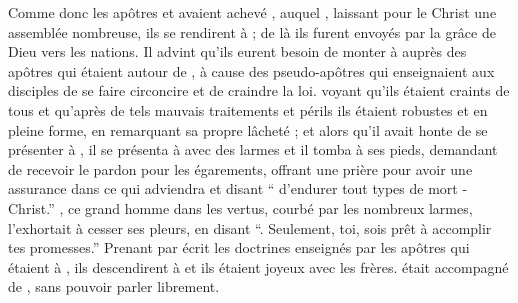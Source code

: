 Comme donc les apôtres  et  avaient achevé , auquel , laissant pour le Christ une assemblée nombreuse, ils se rendirent à  ;
de là ils furent envoyés par la grâce de Dieu vers les nations.
Il advint qu'ils eurent besoin de monter à  auprès des apôtres qui étaient autour de , à cause des pseudo-apôtres qui enseignaient aux disciples de se faire circoncire et de craindre la loi.
 voyant qu'ils étaient craints de tous et qu'après de tels mauvais traitements et périls ils étaient robustes et en pleine forme, 
 en remarquant sa propre lâcheté ;
et alors qu'il avait honte de se présenter à , il se présenta à  %
avec des larmes et il tomba à ses pieds, 
demandant de recevoir le pardon pour les égarements,
offrant une prière pour avoir une assurance dans ce qui adviendra %
et disant \enquote{ d'endurer tout types de mort 
-Christ.}
, ce grand homme dans les vertus, courbé par les nombreux  larmes, l'exhortait à cesser ses pleurs, en disant \enquote{.
Seulement, toi, sois prêt à accomplir tes promesses.}
Prenant par écrit les doctrines enseignés par les apôtres qui étaient à , 
ils descendirent à  et ils étaient joyeux avec les frères. 
 était accompagné de , sans pouvoir parler librement.

